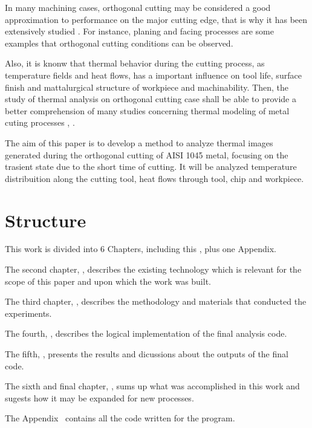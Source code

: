 	In many machining cases, orthogonal cutting may be considered a good approximation to performance on the major cutting edge, that is why it has been extensively studied \cite {shaw2005metal}. For instance, planing and facing processes are some examples that orthogonal cutting conditions can be observed.

	Also, it is knonw that thermal behavior during the cutting process, as temperature fields and heat flows, has a important influence on tool life, surface finish and mattalurgical structure of workpiece and machinability. Then, the study of thermal analysis on orthogonal cutting case shall be able to provide a better comprehension of many studies concerning thermal modeling of metal cuting processes \cite {komanduri2000thermal}, \cite{komanduri2001thermal}.
	
	The aim of this paper is to develop a method to analyze thermal images generated during the orthogonal cutting of AISI 1045 metal, focusing on the trasient state due to the short time of cutting. It will be analyzed temperature distribuition along the cutting tool, heat flows through tool, chip and workpiece.
	
	\section{Structure}
	
	This work is divided into 6 Chapters, including this \textbf{}, plus one Appendix.
	
	The second chapter, \textbf{}, describes the existing technology which is relevant for the scope of this paper and upon which the work was built.

	The third chapter, \textbf{}, describes the methodology and materials that conducted the experiments.
	
	The fourth, \textbf{}, describes the logical implementation of the final analysis code.
	
	The fifth, \textbf{}, presents the results and dicussions about the outputs of the final code.
	
	The sixth and final chapter, \textbf{}, sums up what was accomplished in this work and sugests how it may be expanded for new processes.
	
	The Appendix~\textbf{} contains all the code written for the program.